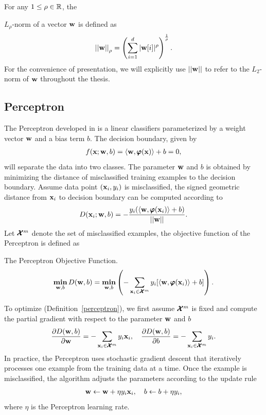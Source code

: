 For any $1\le\rho\in\mathbb{R}$, the {$L_{\rho}$-norm of a vector $\mathbf {w}$ is defined as
\begin{align*}
	\left|\left| \mathbf {w} \right|\right|_{\rho} = \left(\sum_{i=1}^{d}|\mathbf {w}[i]|^{\rho}\right)^{\frac{1}{\rho}}.
\end{align*}
For the convenience of presentation, we will explicitly use $||\mathbf {w}||$ to refer to the $L_2$-norm of $\mathbf {w}$ throughout the thesis.



%
%
\iffalse
\subsection{Perceptron}\label{sc_perceptron}

The Perceptron developed in \citep{Rosenblatt58,Rosenblatt62} is a linear classifiers parameterized by a weight vector $\mathbf {w}$ and a bias term $b$. 
The decision boundary, given by 
\begin{align*}
	f(\mathbf {x};\mathbf {w},b) = \langle \mathbf {w}, \pmb \varphi(\mathbf {x}) \rangle + b =0,
\end{align*}
will separate the data into two classes.
The parameter $\mathbf {w}$ and $b$ is obtained by minimizing the distance of misclassified training examples to the decision boundary.
Assume data point $(\mathbf {x}_i,y_i)$ is misclassified, the signed geometric distance from $\mathbf {x}_i$ to decision boundary can be computed according to
\begin{align*}
	D(\mathbf {x}_i;\mathbf {w},b) = -\frac{y_i(\langle \mathbf {w}, \pmb \varphi(\mathbf {x}_i) \rangle+b)}{\left|\left| \mathbf {w} \right|\right|}.
\end{align*}
Let $\pmb {\mathcal{X}}^m$ denote the set of misclassified examples, the objective function of the Perceptron is defined as
\begin{definition}{The Perceptron Objective Function.}\label{perceptron}
	\begin{align*}
		\underset{\mathbf {w},b}{\textbf{min}} \, D(\mathbf {w},b) = \underset{\mathbf {w},b}{\textbf{min}} \left( -\sum_{\mathbf {x}_i\in\pmb {\mathcal{X}}^{m}}y_i[\langle \mathbf {w}, \pmb \varphi(\mathbf {x}_i) \rangle+b]\right).
	\end{align*}
\end{definition}
\noindent
To optimize (Definition~\ref{perceptron}), we first assume $\pmb {\mathcal{X}}^{m}$ is fixed and compute the partial gradient with respect to the parameter $\mathbf {w}$ and $b$
\begin{align*}
	\frac{\partial D(\mathbf {w},b)}{\partial\mathbf {w}} = -\sum_{\mathbf {x}_i\in\pmb {\mathcal{X}}^m}{y_i\mathbf {x}_i},\quad
	\frac{\partial D(\mathbf {w},b)}{\partial b} = -\sum_{\mathbf {x}_i\in\pmb {\mathcal{X}}^m}{y_i}.
\end{align*}
In practice, the Perceptron uses stochastic gradient descent that iteratively processes one example from the training data at a time.
Once the example is misclassified, the algorithm adjusts the parameters according to the update rule
\begin{align*}
	\mathbf {w} \leftarrow \mathbf {w} + \eta y_i \mathbf {x}_i, \quad b \leftarrow b + \eta y_i,
\end{align*}
where $\eta$ is the Perceptron learning rate.

}
